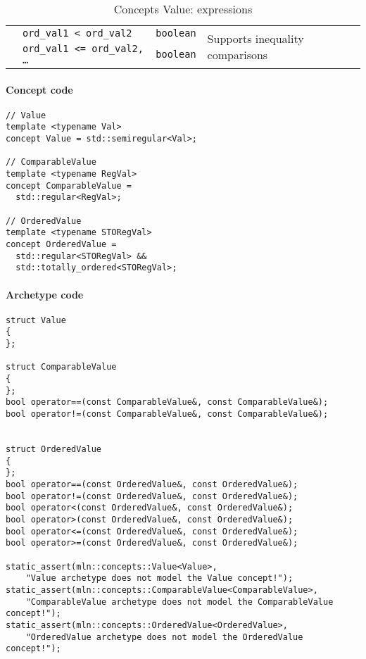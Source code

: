 \begin{table}[htbp]
\begin{scriptsize}
\begin{tabular}{llll}
      \multicolumn{1}{c|}{}                                 & \texttt{ord\_val1 < ord\_val2}                                       & \texttt{boolean}
                                                            & \multicolumn{1}{l}{\multirow{2}{*}{Supports inequality comparisons}}                    \\
      \multicolumn{1}{c|}{}                                 & \texttt{ord\_val1 <= ord\_val2, \dots}                               & \texttt{boolean}
                                                            & \multicolumn{1}{l}{}                                                                    \\
      \cline{1-4}
    \end{tabular}
    \smallskip

    \caption{Concepts Value: expressions}
  \end{scriptsize}
  \label{table:concept.value.expressions}
\end{table}

\paragraph{Concept code}
\begin{verbatim}
// Value
template <typename Val>
concept Value = std::semiregular<Val>;

// ComparableValue
template <typename RegVal>
concept ComparableValue =
  std::regular<RegVal>;

// OrderedValue
template <typename STORegVal>
concept OrderedValue =
  std::regular<STORegVal> &&
  std::totally_ordered<STORegVal>;
\end{verbatim}

\paragraph{Archetype code}

\begin{verbatim}
struct Value
{
};

struct ComparableValue
{
};
bool operator==(const ComparableValue&, const ComparableValue&);
bool operator!=(const ComparableValue&, const ComparableValue&);


struct OrderedValue
{
};
bool operator==(const OrderedValue&, const OrderedValue&);
bool operator!=(const OrderedValue&, const OrderedValue&);
bool operator<(const OrderedValue&, const OrderedValue&);
bool operator>(const OrderedValue&, const OrderedValue&);
bool operator<=(const OrderedValue&, const OrderedValue&);
bool operator>=(const OrderedValue&, const OrderedValue&);

static_assert(mln::concepts::Value<Value>,
    "Value archetype does not model the Value concept!");
static_assert(mln::concepts::ComparableValue<ComparableValue>,
    "ComparableValue archetype does not model the ComparableValue concept!");
static_assert(mln::concepts::OrderedValue<OrderedValue>,
    "OrderedValue archetype does not model the OrderedValue concept!");
\end{verbatim}


